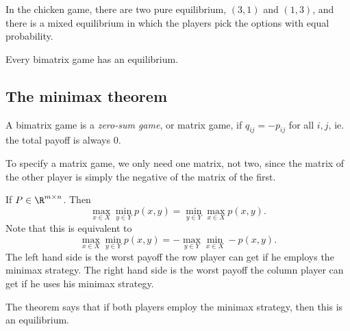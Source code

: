 \documentclass[a4paper]{article}
\begin{document}
\begin{eg}
  In the chicken game, there are two pure equilibrium, $(3, 1)$ and $(1, 3)$, and there is a mixed equilibrium in which the players pick the options with equal probability.
\end{eg}

\begin{thm}[Nash, 1961]
  Every bimatrix game has an equilibrium.
\end{thm}

\subsection{The minimax theorem}
\begin{defi}
  A bimatrix game is a \emph{zero-sum game}, or matrix game, if $q_{ij} = -p_{ij}$ for all $i, j$, ie. the total payoff is always 0.
\end{defi}
To specify a matrix game, we only need one matrix, not two, since the matrix of the other player is simply the negative of the matrix of the first.

\begin{thm}
  If $P\in \R^{m\times n}$. Then
  \[
    \max_{x\in X}\min_{y\in Y} p(x, y) = \min_{y\in Y}\max_{x\in X} p(x, y).
  \]
  Note that this is equivalent to
  \[
    \max_{x\in X}\min_{y\in Y} p(x, y) = -\max_{y\in Y}\min_{x\in X} -p(x, y).
  \]
  The left hand side is the worst payoff the row player can get if he employs the minimax strategy. The right hand side is the worst payoff the column player can get if he uses his minimax strategy.

  The theorem says that if both players employ the minimax strategy, then this is an equilibrium.
\end{thm}
\end{document}
